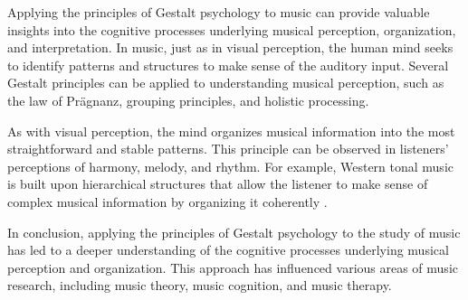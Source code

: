 Applying the principles of Gestalt psychology to music can provide valuable insights into the cognitive processes underlying musical perception, organization, and interpretation. In music, just as in visual perception, the human mind seeks to identify patterns and structures to make sense of the auditory input. Several Gestalt principles can be applied to understanding musical perception, such as the law of Prägnanz, grouping principles, and holistic processing.

As with visual perception, the mind organizes musical information into the most straightforward and stable patterns. This principle can be observed in listeners' perceptions of harmony, melody, and rhythm. For example, Western tonal music is built upon hierarchical structures that allow the listener to make sense of complex musical information by organizing it coherently \cite{Lerdahl1985AMusic}.

In conclusion, applying the principles of Gestalt psychology to the study of music has led to a deeper understanding of the cognitive processes underlying musical perception and organization. This approach has influenced various areas of music research, including music theory, music cognition, and music therapy.